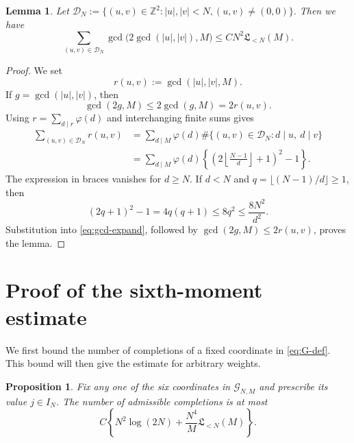 \documentclass[11pt, twoside]{article}
\numberwithin{equation}{section}
\newtheorem{lemma}[theorem]{Lemma}
\newtheorem{proposition}[theorem]{Proposition}
\theoremstyle{definition}
\newcommand{\Z}{\mathbb Z}
\newcommand{\cG}{\mathcal G}
\newcommand{\Lcal}{\mathfrak L}
\begin{document}
\begin{lemma}\label{lem:gcd-direction}
Let
$
\mathcal D_N:=\{(u,v)\in\Z^2:|u|,|v|<N,(u,v)\neq(0,0)\}.
$
Then we have
$$
\sum_{(u,v)\in\mathcal D_N}
\gcd\bigl(2\gcd(|u|,|v|),M\bigr)
\leq CN^2\Lcal_{<N}(M).
$$
\end{lemma}

\begin{proof}
We set
$$
r(u,v):=\gcd(|u|,|v|,M).
$$
If $g=\gcd(|u|,|v|)$, then
$$
\gcd(2g,M)\leq2\gcd(g,M)=2r(u,v).
$$
Using $r=\sum_{d\mid r}\varphi(d)$ and interchanging finite sums gives
\begin{equation}\label{eq:gcd-expand}
\begin{aligned}
\sum_{(u,v)\in\mathcal D_N}r(u,v)
&=\sum_{d\mid M}\varphi(d)
\#\{(u,v)\in\mathcal D_N:d\mid u,\ d\mid v\}\\
&=\sum_{d\mid M}\varphi(d)
\left\{\left(2\left\lfloor\frac{N-1}{d}\right\rfloor+1\right)^2-1\right\}.
\end{aligned}
\end{equation}
The expression in braces vanishes for $d\geq N$.  If $d<N$ and
$q=\lfloor(N-1)/d\rfloor\geq1$, then
$$
(2q+1)^2-1=4q(q+1)\leq8q^2\leq\frac{8N^2}{d^2}.
$$
Substitution into \eqref{eq:gcd-expand}, followed by
$\gcd(2g,M)\leq2r(u,v)$, proves the lemma.
\end{proof}

\section{Proof of the sixth-moment estimate}\label{sec:main-proof}

We first bound the number of completions of a fixed coordinate in
\eqref{eq:G-def}.  This bound will then give the estimate for arbitrary
weights.

\begin{proposition}\label{prop:fixed-slot}
Fix any one of the six coordinates in $\cG_{N,M}$ and prescribe its value
$j\in I_N$.  The number of admissible completions is at most
\begin{equation}\label{eq:fixed-slot}
C\left\{N^2\log(2N)+\frac{N^4}{M}\Lcal_{<N}(M)\right\}.
\end{equation}
\end{proposition}
\end{document}
